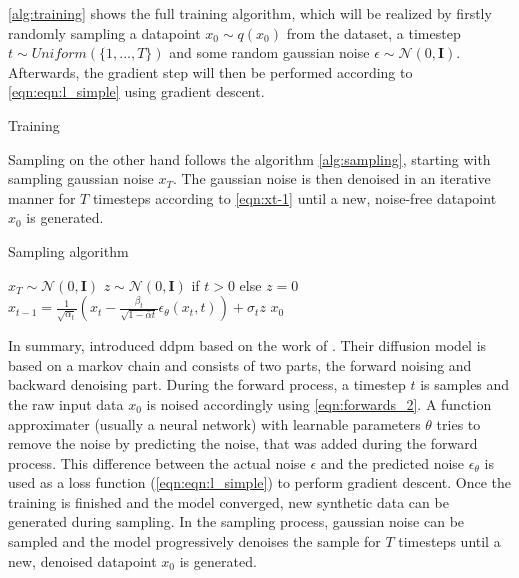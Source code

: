 \autoref{alg:training} shows the full training algorithm, which will be realized by firstly randomly sampling a datapoint $x_0 \sim q(x_0)$ from the dataset, a timestep $t\sim Uniform(\{1, ..., T\})$ and some random gaussian noise $\epsilon \sim \mathcal{N}(0, \textbf{I})$.
Afterwards, the gradient step will then be performed according to \autoref{eqn:eqn:l_simple} using gradient descent.

\begin{algorithm}
  \caption[Training]{Training \cite[p. 4]{ho2020DenoisingDiffusionProbabilistic}}
  \label{alg:training}
\end{algorithm}


Sampling on the other hand follows the algorithm \autoref{alg:sampling}, starting with sampling gaussian noise $x_T$.
The gaussian noise is then denoised in an iterative manner for $T$ timesteps according to \autoref{eqn:xt-1} until a new, noise-free datapoint $x_0$ is generated.

\begin{algorithm}
\caption[Sampling algorithm]{Sampling algorithm \cite[p. 4]{ho2020DenoisingDiffusionProbabilistic}}
  \label{alg:sampling}
  \begin{algorithmic}
  \State $x_T \sim \mathcal{N}(0, \mathbf{I})$
  \State $z \sim \mathcal{N}(0, \mathbf{I})$ if $t > 0$ else $z = 0$
  \State $x_{t-1} = \frac{1}{\sqrt{\alpha_t}}\left(x_t - \frac{\beta_t}{\sqrt{1-\bar{\alpha}t}}\epsilon_{\theta}(x_t,t)\right) + \sigma_t z$
  \EndFor
  \State \Return $x_0$
  \end{algorithmic}
\end{algorithm}

In summary, \cite{ho2020DenoisingDiffusionProbabilistic} introduced \gls{ddpm} based on the work of \cite{sohl-dickstein2015DeepUnsupervisedLearning}.
Their diffusion model is based on a markov chain and consists of two parts, the forward noising and backward denoising part.
During the forward process, a timestep $t$ is samples and the raw input data $x_0$ is noised accordingly using \autoref{eqn:forwards_2}.
A function approximater (usually a neural network) with learnable parameters $\theta$ tries to remove the noise by predicting the noise, that was added during the forward process.
This difference between the actual noise $\epsilon$ and the predicted noise $\epsilon_{\theta}$ is used as a loss function (\autoref{eqn:eqn:l_simple}) to perform gradient descent.
Once the training is finished and the model converged, new synthetic data can be generated during sampling.
In the sampling process, gaussian noise can be sampled and the model progressively denoises the sample for $T$ timesteps until a new, denoised datapoint $x_0$ is generated.

